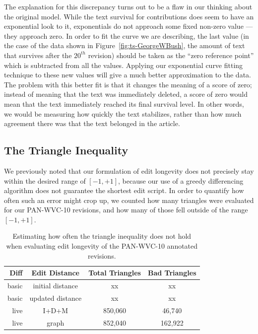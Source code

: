 The explanation for this discrepancy turns out to be a flaw in our
thinking about the original model.
While the text survival for contributions does seem to have an
exponential look to it, exponentials do not approach some fixed
non-zero value --- they approach zero.
In order to fit the curve we are describing, the last value
(in the case of the data shown in Figure~\ref{fig:ts-GeorgeWBush},
the amount of text that survives after the $20^{th}$ revision)
should be taken as the ``zero reference point'' which is subtracted
from all the values.
Applying our exponential curve fitting technique to these new values
will give a much better approximation to the data.
The problem with this better fit is that it changes the meaning of
a score of zero; instead of meaning that the text was immediately deleted,
a score of zero would mean that the text immediately reached its
final survival level.
In other words, we would be measuring how quickly the text stabilizes,
rather than how much agreement there was that the text belonged in
the article.

\subsection{The Triangle Inequality}

We previously noted that our formulation of edit longevity does
not precisely stay within the desired range of $[-1,+1]$,
because our use of a greedy differencing algorithm does not
guarantee the shortest edit script.
In order to quantify how often such an error might crop up,
we counted how many triangles were evaluated for our PAN-WVC-10
revisions, and how many of those fell outside of the range $[-1,+1]$.

\begin{table}[htbp]
\begin{center}
\begin{tabular}{|r|c|c|c|}
\hline
Diff & Edit Distance & Total Triangles & Bad Triangles \\
\hline
\hline
basic & initial distance & xx & xx \\
basic & updated distance & xx & xx \\
live & I+D+M & 850,060 & 46,740 \\
live & graph & 852,040 & 162,922 \\
\hline
\end{tabular}
\end{center}
\caption{Estimating how often the triangle inequality does
    not hold when evaluating edit longevity of the
    PAN-WVC-10 annotated revisions.
} 
\label{tbl:badtriangles}
\end{table}


